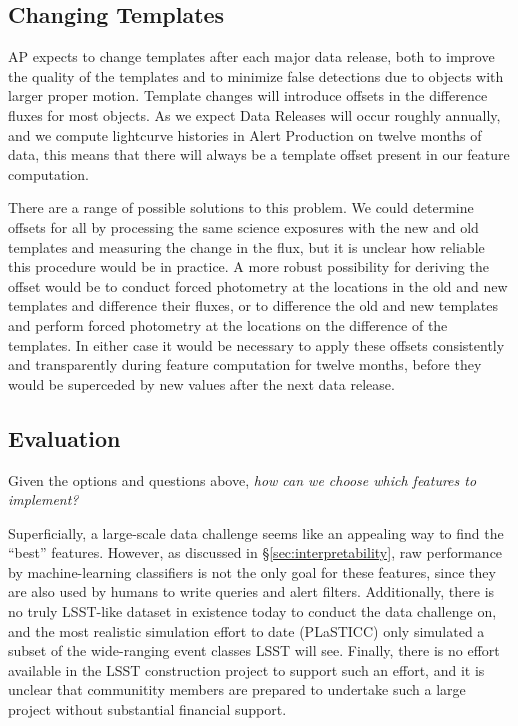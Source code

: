 \documentclass[DM,authoryear,toc]{lsstdoc}
\begin{document}

\subsection{Changing Templates} \label{sec:template_change}

AP expects to change templates after each major data release, both to improve the quality of the templates and to minimize false detections due to objects with larger proper motion.
Template changes will introduce offsets in the difference fluxes for most objects.
As we expect Data Releases will occur roughly annually, and we compute lightcurve histories in Alert Production on twelve months of data, this means that there will always be a template offset present in our feature computation.

There are a range of possible solutions to this problem.
We could determine offsets for all \DIAObjects by processing the same science exposures with the new and old templates and measuring the change in the \DIASource flux, but it is unclear how reliable this procedure would be in practice.
A more robust possibility for deriving the offset would be to conduct forced photometry at the \DIAObject locations in the old and new templates and difference their fluxes, or to difference the old and new templates and perform forced photometry at the \DIAObject locations on the difference of the templates.
In either case it would be necessary to apply these offsets consistently and transparently during feature computation for twelve months, before they would be superceded by new values after the next data release.


\subsection{Evaluation}

Given the options and questions above,
\textit{how can we choose which features to implement?}

Superficially, a large-scale data challenge seems like an appealing way to find the ``best'' features.
However, as discussed in \S \ref{sec:interpretability}, raw performance by machine-learning classifiers is not the only goal for these features, since they are also used by humans to write queries and alert filters.
Additionally, there is no truly LSST-like dataset in existence today to conduct the data challenge on, and the most realistic simulation effort to date (PLaSTICC) only simulated a subset of the wide-ranging event classes LSST will see.
Finally, there is no effort available in the LSST construction project to support such an effort, and it is unclear that communitity members are prepared to undertake such a large project without substantial financial support.
\end{document}
